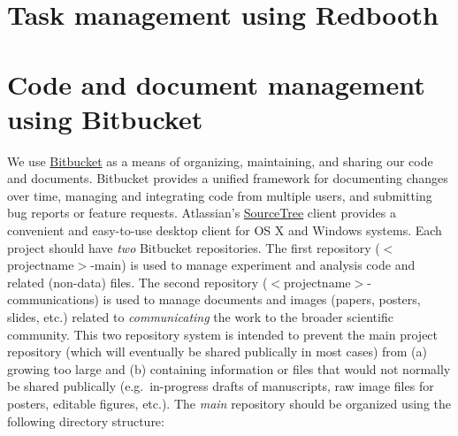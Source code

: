 \documentclass{tufte-book} %
\begin{document}
\section{Task management using Redbooth}

 \section{Code and document management using Bitbucket}\label{sec:bitbucket}
 We use \href{https://www.bitbucket.org/}{Bitbucket} as a means of organizing, maintaining, and sharing
 our code and documents.  Bitbucket provides a unified framework for
 documenting changes over time, managing and integrating code from
 multiple users, and submitting bug reports or feature requests. 
Atlassian's
 \href{https://www.atlassian.com/software/sourcetree/overview?_mid=1ba3573dadf246f44f2a97bc50bfd72e&gclid=Cj0KEQiA4OqnBRDAj9aazvPji9ABEiQANq28oBGvgRhznXBb_RDL6QRe0IM7vvEUXFkRDoWBSbpmsmAaAkCE8P8HAQ}{SourceTree}
 client provides a convenient and easy-to-use desktop client for OS X
 and Windows systems.  Each project should have \textit{two} Bitbucket
 repositories.  The first repository ($<$projectname$>$-main) is used to
 manage experiment and analysis code and related (non-data) files.
 The second repository ($<$projectname$>$-communications) is used to
 manage documents and images (papers, posters, slides, etc.) related
 to \textit{communicating} the work to the broader scientific
 community.  This two repository system is intended to prevent the main project
 repository (which will eventually be shared publically in most cases)
 from (a) growing too large and (b) containing information or files
 that would not normally be shared publically (e.g.\ in-progress
 drafts of manuscripts, raw image files for posters, editable figures,
 etc.).  The \textit{main} repository should be organized using the following directory structure:
\end{document}
